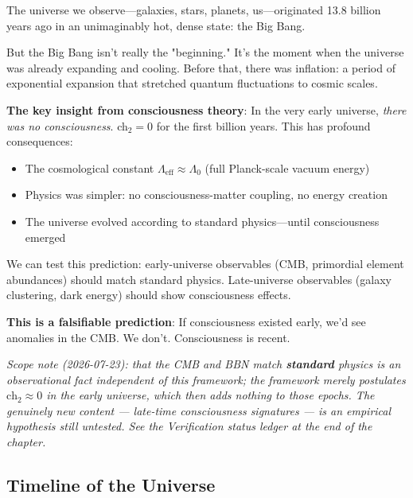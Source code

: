 \begin{intuitive}
The universe we observe—galaxies, stars, planets, us—originated 13.8 billion years ago in an unimaginably hot, dense state: the Big Bang.

But the Big Bang isn't really the "beginning." It's the moment when the universe was already expanding and cooling. Before that, there was inflation: a period of exponential expansion that stretched quantum fluctuations to cosmic scales.

\textbf{The key insight from consciousness theory}: In the very early universe, \textit{there was no consciousness}. ch$_2 = 0$ for the first billion years. This has profound consequences:
\begin{itemize}
\item The cosmological constant $\Lambda_{\text{eff}} \approx \Lambda_0$ (full Planck-scale vacuum energy)
\item Physics was simpler: no consciousness-matter coupling, no energy creation
\item The universe evolved according to standard physics—until consciousness emerged
\end{itemize}

We can test this prediction: early-universe observables (CMB, primordial element abundances) should match standard physics. Late-universe observables (galaxy clustering, dark energy) should show consciousness effects.

\textbf{This is a falsifiable prediction}: If consciousness existed early, we'd see anomalies in the CMB. We don't. Consciousness is recent.

\emph{Scope note (2026-07-23): that the CMB and BBN match \textbf{standard} physics is an observational fact independent of this framework; the framework merely \emph{postulates} $\text{ch}_2\approx0$ in the early universe, which then adds nothing to those epochs. The genuinely new content --- late-time consciousness signatures --- is an empirical hypothesis still untested. See the Verification status ledger at the end of the chapter.}
\end{intuitive}

\subsection{Timeline of the Universe}

